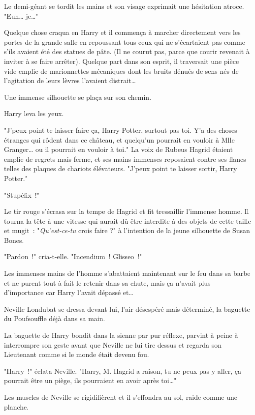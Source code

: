 Le demi-géant se tordit les mains et son visage exprimait une hésitation atroce. "Euh… je…"

Quelque chose craqua en Harry et il commença à marcher directement vers les portes de la grande salle en repoussant tous ceux qui ne s'écartaient pas comme s'ils avaient été des statues de pâte. (Il ne courut pas, parce que courir revenait à inviter à se faire arrêter). Quelque part dans son esprit, il traversait une pièce vide emplie de marionnettes mécaniques dont les bruits dénués de sens nés de l'agitation de leurs lèvres l'avaient distrait…

Une immense silhouette se plaça sur son chemin.

Harry leva les yeux.

"J'peux point te laisser faire ça, Harry Potter, surtout pas toi. Y'a des choses étranges qui rôdent dans ce château, et quelqu'un pourrait en vouloir à Mlle Granger… ou il pourrait en vouloir à toi." La voix de Rubeus Hagrid étaient emplie de regrets mais ferme, et ses mains immenses reposaient contre ses flancs telles des plaques de chariots élévateurs. "J'peux point te laisser sortir, Harry Potter."

"Stupéfix~!"

Le tir rouge s'écrasa sur la tempe de Hagrid et fit tressaillir l'immense homme. Il tourna la tête à une vitesse qui aurait dû être interdite à des objets de cette taille et mugit~: "\emph{Qu'est-ce-tu} crois faire ?" à l'intention de la jeune silhouette de Susan Bones.

"Pardon~!" cria-t-elle. "Incendium~! Glisseo~!"

Les immenses mains de l'homme s'abattaient maintenant sur le feu dans sa barbe et ne purent tout à fait le retenir dans sa chute, mais ça n'avait plus d'importance car Harry l'avait dépassé et…

Neville Londubat se dressa devant lui, l'air désespéré mais déterminé, la baguette du Poufsouffle déjà dans sa main.

La baguette de Harry bondit dans la sienne par pur réflexe, parvint à peine à interrompre son geste avant que Neville ne lui tire dessus et regarda son Lieutenant comme si le monde était devenu fou.

"Harry~!" éclata Neville. "Harry, M. Hagrid a raison, tu ne peux pas y aller, ça pourrait être un piège, ils pourraient en avoir après toi…"

Les muscles de Neville se rigidifièrent et il s'effondra au sol, raide comme une planche.

